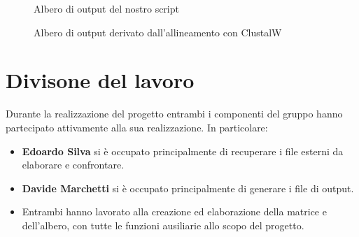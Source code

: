 \documentclass[11pt,italian]{article}
\begin{document}
\newpage
\begin{figure}[H]
  \caption{Albero di output del nostro script}
  \label{fig:script-tree}
\end{figure}
\begin{figure}[H]
  \caption{Albero di output derivato dall'allineamento con ClustalW}
  \label{fig:tool-tree}
\end{figure}

\newpage
\section{Divisone del lavoro}
Durante la realizzazione del progetto entrambi i componenti del gruppo hanno partecipato attivamente alla sua realizzazione. In particolare:
\begin{itemize}
  \item \textbf{Edoardo Silva} si è occupato principalmente di recuperare i file esterni da elaborare e confrontare.
  \item \textbf{Davide Marchetti} si è occupato principalmente di generare i file di output.
  \item Entrambi hanno lavorato alla creazione ed elaborazione della matrice e dell'albero, con tutte le funzioni ausiliarie allo scopo del progetto.
\end{itemize}
\end{document}
